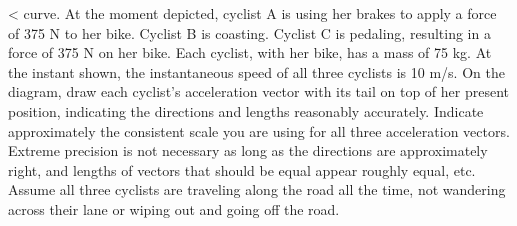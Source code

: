 <%
curve. At the moment depicted, cyclist A is using her brakes
to apply a force of 375 N to her bike.  Cyclist B is
coasting.  Cyclist C is pedaling, resulting in a force of
375 N on her bike.  Each cyclist, with her bike, has a
mass of 75 kg.  At the instant shown, the instantaneous
speed of all three cyclists is 10 m/s.  On the diagram, draw
each cyclist's acceleration vector with its tail on top of
her present position, indicating the directions and lengths
reasonably accurately.  Indicate approximately the
consistent scale you are using for all three acceleration
vectors.  Extreme precision is not necessary as long as the
directions are approximately right, and lengths of vectors
that should be equal appear roughly equal, etc.  Assume all
three cyclists are traveling along the road all the time,
not wandering across their lane or wiping out and going off the road.
